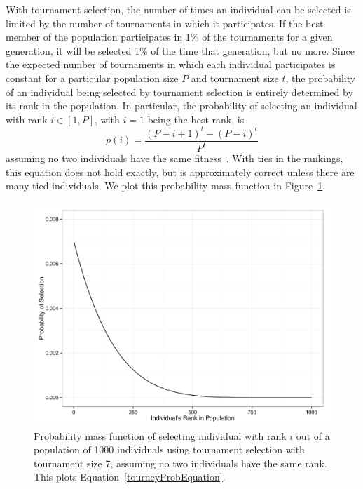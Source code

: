 \documentclass{sig-alternate}
\begin{document}
With tournament selection, the number of times an individual can be selected is limited by the number of tournaments in which it participates. If the best member of the population participates in 1\% of the tournaments for a given generation, it will be selected 1\% of the time that generation, but no more.
 Since the expected number of tournaments in which each individual participates is constant for a particular population size $P$ and tournament size $t$, the probability of an individual being selected by tournament selection is entirely determined by its rank in the population. In particular, the probability of selecting an individual with rank $i \in [1,P]$, with $i = 1$ being the best rank, is
\begin{equation}\label{tourneyProbEquation}
p(i) = \frac{(P-i+1)^t - (P-i)^t}{P^t}
\end{equation}
assuming no two individuals have the same fitness~\cite{350042, Blickle:1995:MAT:645514.658088}. With ties in the rankings, this equation does not hold exactly, but is approximately correct unless there are many tied individuals. We plot this probability mass function in Figure~\ref{fig:prob-selection-tourney-7}.

\begin{figure}[h] %
\centering
\includegraphics[width=\linewidth]{probSelectionTourney7.pdf}
\caption{Probability mass function of selecting individual with rank $i$ out of a population of 1000 individuals using tournament selection with tournament size 7, assuming no two individuals have the same rank. This plots Equation~\ref{tourneyProbEquation}.}
\label{fig:prob-selection-tourney-7}
\end{figure}
\end{document}
